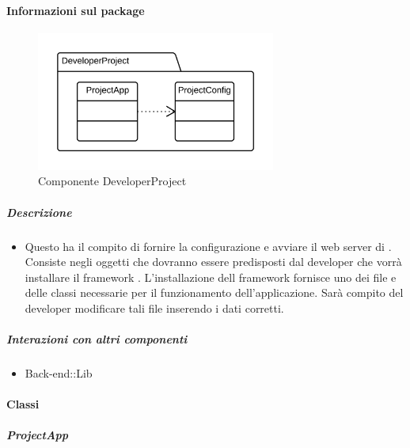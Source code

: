 	\paragraph{Informazioni sul package} 
		\begin{figure}[H] 
			\begin{center} 
				\centering
				\includegraphics[width=0.7\textwidth]{uml/package/Back-end::DeveloperProject.png}  
				\caption{Componente DeveloperProject}
			\end{center}  
		\end{figure} 
	\subparagraph{Descrizione} 
		\begin{itemize}
		\item[] Questo  ha il compito di fornire la configurazione e avviare il web server di . Consiste negli oggetti che dovranno essere predisposti dal developer che vorrà installare il framework . L'installazione dell framework  fornisce uno  dei file e delle classi necessarie per il funzionamento dell'applicazione. Sarà compito del developer modificare tali file inserendo i dati corretti.
		\end{itemize} 
	\subparagraph{Interazioni con altri componenti} 
		\begin{itemize} 
				\item Back-end::Lib  
		\end{itemize} 
		\paragraph{Classi}
			\subparagraph{ProjectApp}
				
